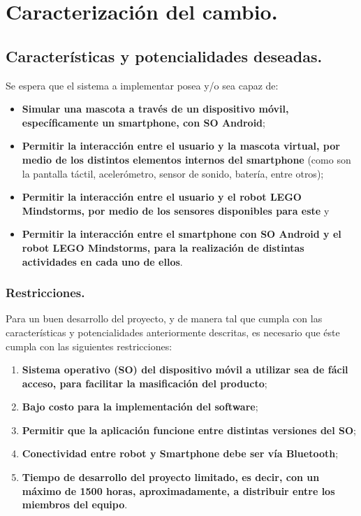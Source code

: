 \newpage
\section{Caracterizaci\'on del cambio.}
\subsection{Caracter\'isticas y potencialidades deseadas.}

Se espera que el sistema a implementar posea y/o sea capaz de:
\begin{itemize}
\item {\bf Simular una mascota a trav\'es de un dispositivo m\'ovil, espec\'ificamente un smartphone, con SO Android};
\item {\bf Permitir la interacci\'on entre el usuario y la mascota virtual, por medio de los distintos elementos internos del smartphone} (como son la pantalla t\'actil, aceler\'ometro, sensor de sonido, bater\'ia, entre otros);
\item {\bf Permitir la interacci\'on entre el usuario y el robot LEGO Mindstorms, por medio de los sensores disponibles para este} y
\item {\bf Permitir la interacci\'on entre el smartphone con SO Android y el robot LEGO Mindstorms, para la realizaci\'on de distintas actividades en cada uno de ellos}.
\end{itemize}

\subsubsection{Restricciones.}

Para un buen desarrollo del proyecto, y de manera tal que cumpla con las caracter\'isticas y potencialidades anteriormente descritas, es necesario que \'este cumpla con las siguientes restricciones:
\begin{enumerate}
\item {\bf Sistema operativo (SO) del dispositivo m\'ovil a utilizar sea de f\'acil acceso, para facilitar la masificaci\'on del producto};
\item {\bf Bajo costo para la implementaci\'on del software};
\item {\bf Permitir que la aplicaci\'on funcione entre distintas versiones del SO};
\item {\bf Conectividad entre robot y Smartphone debe ser v\'ia Bluetooth};
\item {\bf Tiempo de desarrollo del proyecto limitado, es decir, con un m\'aximo de 1500 horas, aproximadamente, a distribuir entre los miembros del equipo}.
\end{enumerate}

